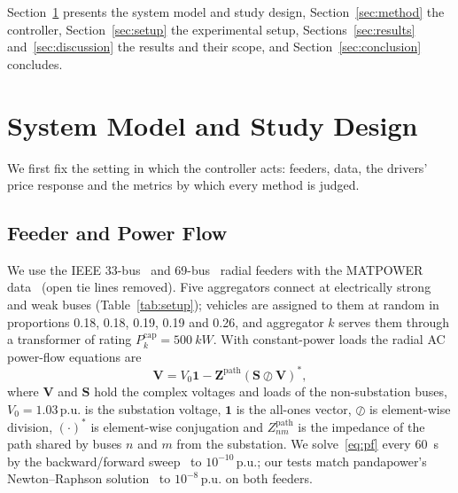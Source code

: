 \documentclass[journal]{IEEEtran}
\newcommand{\pu}{\,\mathrm{p.u.}}
\begin{document}
Section~\ref{sec:system} presents the system model and study design,
Section~\ref{sec:method} the controller, Section~\ref{sec:setup} the
experimental setup, Sections~\ref{sec:results} and~\ref{sec:discussion} the
results and their scope, and Section~\ref{sec:conclusion} concludes.

\section{System Model and Study Design}
\label{sec:system}
We first fix the setting in which the controller acts: feeders, data, the
drivers' price response and the metrics by which every method is judged.

\subsection{Feeder and Power Flow}
We use the IEEE 33-bus~\cite{baran1989} and 69-bus~\cite{baran1989cap} radial
feeders with the MATPOWER data~\cite{zimmerman2011} (open tie lines removed).
Five aggregators connect at electrically strong and weak buses
(Table~\ref{tab:setup}); vehicles are assigned to them
at random in proportions 0.18, 0.18, 0.19, 0.19 and 0.26, and aggregator $k$
serves them through a transformer of rating $P^{\mathrm{cap}}_k=\SI{500}{kW}$.
With constant-power loads the radial AC power-flow equations are
\begin{equation}
\mathbf{V}=V_0\mathbf{1}-\mathbf{Z}^{\mathrm{path}}\left(\mathbf{S}\oslash\mathbf{V}\right)^{*},
\label{eq:pf}
\end{equation}
where $\mathbf{V}$ and $\mathbf{S}$ hold the complex voltages and loads of the
non-substation buses, $V_0=1.03\pu$ is the substation voltage, $\mathbf{1}$ is
the all-ones vector, $\oslash$ is element-wise division, $(\cdot)^*$ is
element-wise conjugation and $Z^{\mathrm{path}}_{nm}$ is the impedance of the
path shared by buses $n$ and $m$ from the substation. We solve~\eqref{eq:pf}
every \SI{60}{s} by the backward/forward sweep~\cite{shirmohammadi1988} to
$10^{-10}\pu$; our tests match pandapower's Newton--Raphson
solution~\cite{thurner2018} to $10^{-8}\pu$ on both feeders.

\begin{table}[t]
\centering
\caption{Simulation Setup, Read From the Configuration File and the Code}
\label{tab:setup}
\footnotesize
\setlength{\tabcolsep}{3pt}

\end{table}
\end{document}
